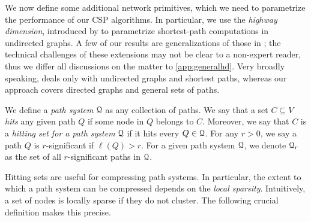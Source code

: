 We now define some additional network primitives, which we need to parametrize the performance of our CSP algorithms. 
In particular, we use the \emph{highway dimension}, introduced by \citep{highway2013,highway2010} to parametrize shortest-path computations in undirected graphs. 
A few of our results are generalizations of those in \citep{highway2013}; the technical challenges of these extensions may not be clear to a non-expert reader, thus we differ all discussions on the matter to \cref{app:generalhd}. 
Very broadly speaking, \citep{highway2013} deals only with undirected graphs and shortest paths, whereas our approach covers directed graphs and general sets of paths.

We define a \emph{path system} $\mathcal{Q}$ as any collection of paths.
We say that a set $C\subseteq V$ \emph{hits} any given path $Q$ if some node in $Q$ belongs to $C$. Moreover, we say that $C$ is a \emph{hitting set for a path system} $\mathcal{Q}$ if it hits every $Q\in\mathcal{Q}$. 
For any $r>0$, we say a path $Q$ is $r$-significant if $\ell(Q)>r$. 
For a given path system $\mathcal{Q}$, we denote $\mathcal{Q}_r$ as the set of all $r$-significant paths in $\mathcal{Q}$.

Hitting sets are useful for compressing path systems. 
In particular, the extent to which a path system can be compressed depends on the \emph{local sparsity}.
Intuitively, a set of nodes is locally sparse if they do not cluster.
The following crucial definition makes this precise.



